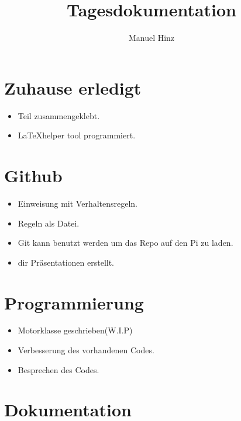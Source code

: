 \documentclass{article}
\author{Manuel Hinz}
\title{Tagesdokumentation}
\begin{document}
\maketitle

\section{Zuhause erledigt}

\begin{itemize}

\item Teil zusammengeklebt.

\item \LaTeX helper tool programmiert. 

\end{itemize}

\section{Github}

\begin{itemize}

\item Einweisung mit Verhaltensregeln.

\item Regeln als Datei.

\item Git kann benutzt werden um das Repo auf den Pi zu laden.

\item dir Präsentationen erstellt.

\end{itemize}

\section{Programmierung}

\begin{itemize}

\item Motorklasse geschrieben(W.I.P)

\item Verbesserung des vorhandenen Codes.

\item Besprechen des Codes.

\end{itemize}

\section{Dokumentation}
\end{document}
